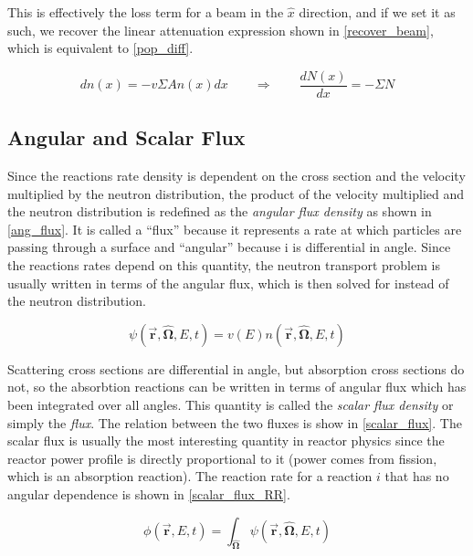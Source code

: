 This is effectively the loss term for a beam in the $\hat{x}$ direction, and if we set it as such, we recover the linear attenuation expression shown in \eqref{recover_beam}, which is equivalent to \eqref{pop_diff}.  

\begin{equation}
\label{recover_beam}
dn(x) = - v \Sigma A n(x)dx  \qquad \Rightarrow \qquad  \frac{dN(x)}{dx}= - \Sigma N
\end{equation}


\subsection{Angular and Scalar Flux}

Since the reactions rate density is dependent on the cross section and the velocity multiplied by the neutron distribution, the product of the velocity multiplied and the neutron distribution is redefined as the \emph{angular flux density} as shown in \eqref{ang_flux}.  It is called a ``flux'' because it represents a rate at which particles are passing through a surface and ``angular'' because i is differential in angle.  Since the reactions rates depend on this quantity, the neutron transport problem is usually written in terms of the angular flux, which is then solved for instead of the neutron distribution.

\begin{equation}
\label{ang_flux}
\psi(\boldsymbol{\vec{r}},\boldsymbol{\hat{\Omega}},E,t) = v(E) n(\boldsymbol{\vec{r}},\boldsymbol{\hat{\Omega}},E,t)
\end{equation}

Scattering cross sections are differential in angle, but absorption cross sections do not, so the absorbtion reactions can be written in terms of angular flux which has been integrated over all angles.  This quantity is called the \emph{scalar flux density} or simply the \emph{flux}.  The relation between the two fluxes is show in \eqref{scalar_flux}.  The scalar flux is usually the most interesting quantity in reactor physics since the reactor power profile is directly proportional to it (power comes from fission, which is an absorption reaction).  The reaction rate for a reaction $i$ that has no angular dependence is shown in \eqref{scalar_flux_RR}.

\begin{equation}
\label{scalar_flux}
\phi(\boldsymbol{\vec{r}},E,t) = \int_{\boldsymbol{\hat{\Omega}}} \psi(\boldsymbol{\vec{r}},\boldsymbol{\hat{\Omega}},E,t)
\end{equation}

